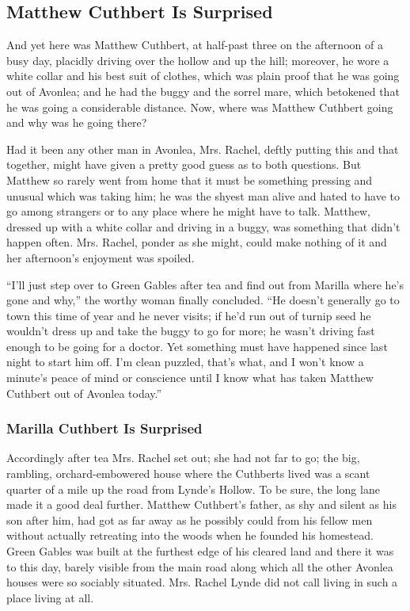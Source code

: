 \documentclass{article}
\begin{document}
\subsection{Matthew Cuthbert Is Surprised}
And yet here was Matthew Cuthbert, at half-past three on the afternoon of a busy day, placidly driving over the hollow and up the hill; moreover, he wore a white collar and his best suit of clothes, which was plain proof that he was going out of Avonlea; and he had the buggy and the sorrel mare, which betokened that he was going a considerable distance. Now, where was Matthew Cuthbert going and why was he going there?

Had it been any other man in Avonlea, Mrs. Rachel, deftly putting this and that together, might have given a pretty good guess as to both questions. But Matthew so rarely went from home that it must be something pressing and unusual which was taking him; he was the shyest man alive and hated to have to go among strangers or to any place where he might have to talk. Matthew, dressed up with a white collar and driving in a buggy, was something that didn't happen often. Mrs. Rachel, ponder as she might, could make nothing of it and her afternoon's enjoyment was spoiled.

``I'll just step over to Green Gables after tea and find out from Marilla where he's gone and why,'' the worthy woman finally concluded. ``He doesn't generally go to town this time of year and he never visits; if he'd run out of turnip seed he wouldn't dress up and take the buggy to go for more; he wasn't driving fast enough to be going for a doctor. Yet something must have happened since last night to start him off. I'm clean puzzled, that's what, and I won't know a minute's peace of mind or conscience until I know what has taken Matthew Cuthbert out of Avonlea today.''

\subsubsection{Marilla Cuthbert Is Surprised}
Accordingly after tea Mrs. Rachel set out; she had not far to go; the big, rambling, orchard-embowered house where the Cuthberts lived was a scant quarter of a mile up the road from Lynde's Hollow. To be sure, the long lane made it a good deal further. Matthew Cuthbert's father, as shy and silent as his son after him, had got as far away as he possibly could from his fellow men without actually retreating into the woods when he founded his homestead. Green Gables was built at the furthest edge of his cleared land and there it was to this day, barely visible from the main road along which all the other Avonlea houses were so sociably situated. Mrs. Rachel Lynde did not call living in such a place living at all.
\end{document}
